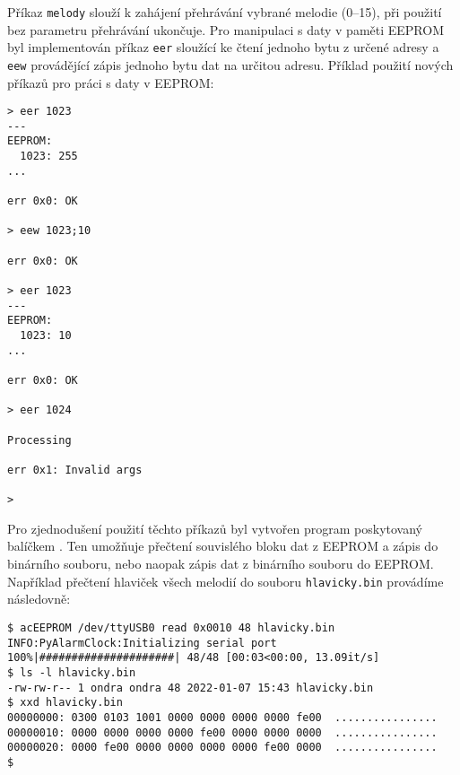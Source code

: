 Příkaz \verb|melody| slouží k zahájení přehrávání vybrané melodie
(\numrange{0}{15}), při použití bez parametru přehrávání ukončuje.
Pro manipulaci s daty v paměti EEPROM byl implementován příkaz
\verb|eer| sloužící ke čtení jednoho bytu z určené adresy a \verb|eew|
provádějící zápis jednoho bytu dat na určitou adresu. Příklad použití nových
příkazů pro práci s daty v EEPROM:
\begin{lstlisting}[style=terminal]
> eer 1023
---
EEPROM:
  1023: 255
...

err 0x0: OK

> eew 1023;10

err 0x0: OK

> eer 1023
---
EEPROM:
  1023: 10
...

err 0x0: OK

> eer 1024

Processing

err 0x1: Invalid args

>
\end{lstlisting}

Pro zjednodušení použití těchto příkazů byl vytvořen program
 poskytovaný balíčkem . Ten umožňuje
přečtení souvislého bloku dat z EEPROM a zápis do binárního souboru, nebo
naopak zápis dat z binárního souboru do EEPROM. Například přečtení hlaviček
všech melodií do souboru \texttt{hlavicky.bin} provádíme následovně:
\begin{lstlisting}[style=terminal]
$ acEEPROM /dev/ttyUSB0 read 0x0010 48 hlavicky.bin
INFO:PyAlarmClock:Initializing serial port
100%|#####################| 48/48 [00:03<00:00, 13.09it/s]
$ ls -l hlavicky.bin
-rw-rw-r-- 1 ondra ondra 48 2022-01-07 15:43 hlavicky.bin
$ xxd hlavicky.bin
00000000: 0300 0103 1001 0000 0000 0000 0000 fe00  ................
00000010: 0000 0000 0000 0000 fe00 0000 0000 0000  ................
00000020: 0000 fe00 0000 0000 0000 0000 fe00 0000  ................
$
\end{lstlisting}

